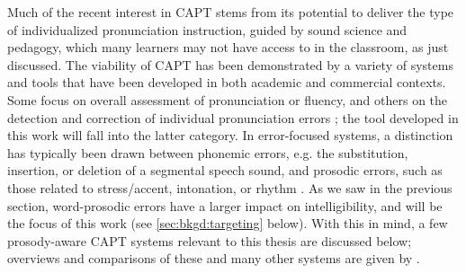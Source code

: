Much of the recent interest in CAPT stems from its potential to deliver the type of individualized pronunciation instruction, guided by sound science and pedagogy, which many learners may not have access to in the classroom, as just discussed.
%
%
%	
%
%
%	
%	
	\label{sec:capt:systems}
%		
	The viability of CAPT has been demonstrated by a variety of systems and tools that have been developed in both academic and commercial contexts. Some focus on overall assessment of pronunciation or fluency, and others on the detection and correction of individual pronunciation errors \citep{Eskenazi2009}; the tool developed in this work will fall into the latter category. In error-focused systems, a distinction has typically been drawn between phonemic errors, e.g. the substitution, insertion, or deletion of a segmental speech sound, and prosodic errors, such as those related to stress/accent, intonation, or rhythm \citep{Witt2012}. As we saw in the previous section, word-prosodic errors have a larger impact on intelligibility, and will be the focus of this work (see \cref{sec:bkgd:targeting} below). With this in mind, a few prosody-aware CAPT systems relevant to this thesis are discussed below; overviews and comparisons of these and many other systems are given by \textcite{Neri2002,Eskenazi2009,Delmonte2011,Witt2012}.  
		
